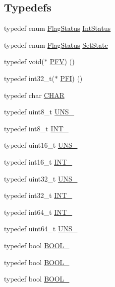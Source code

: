 \subsection*{Typedefs}
\begin{DoxyCompactItemize}
\item 
typedef enum \hyperlink{group___l_p_c___types___public___types_ga89136caac2e14c55151f527ac02daaff}{Flag\+Status} \hyperlink{group___l_p_c___types___public___types_gab7d263072f745b4f3913fb0afc434c4e}{Int\+Status}
\item 
typedef enum \hyperlink{group___l_p_c___types___public___types_ga89136caac2e14c55151f527ac02daaff}{Flag\+Status} \hyperlink{group___l_p_c___types___public___types_ga7fab312a9f10f1386a955977d2ec96fe}{Set\+State}
\item 
typedef void($\ast$ \hyperlink{group___l_p_c___types___public___types_ga5f7b826e88ffb1fae2260abb3a75b19a}{P\+FV}) ()
\item 
typedef int32\+\_\+t($\ast$ \hyperlink{group___l_p_c___types___public___types_ga5cad251913e41ad7a8c765945356ec47}{P\+FI}) ()
\item 
typedef char \hyperlink{group___l_p_c___types___public___types_gaebb9e13210d88d43e32e735ada43a425}{C\+H\+AR}
\item 
typedef uint8\+\_\+t \hyperlink{group___l_p_c___types___public___types_ga7353117656180c64d2216c874998b98b}{U\+N\+S\+\_}
\item 
typedef int8\+\_\+t \hyperlink{group___l_p_c___types___public___types_gac172005ce53b001f50a677cc10bd17b0}{I\+N\+T\+\_}
\item 
typedef uint16\+\_\+t \hyperlink{group___l_p_c___types___public___types_gafce87a7f2271b2cf38d7532f157f8a50}{U\+N\+S\+\_}
\item 
typedef int16\+\_\+t \hyperlink{group___l_p_c___types___public___types_gaae6e34a91bf60db05de64de7720df9a5}{I\+N\+T\+\_}
\item 
typedef uint32\+\_\+t \hyperlink{group___l_p_c___types___public___types_ga28adf5c6b1811ca447826319598d8aba}{U\+N\+S\+\_}
\item 
typedef int32\+\_\+t \hyperlink{group___l_p_c___types___public___types_ga3a17614f3a1b67eaf20781d8ec16a652}{I\+N\+T\+\_}
\item 
typedef int64\+\_\+t \hyperlink{group___l_p_c___types___public___types_ga1a0aab29eee6b306564084e005fa5750}{I\+N\+T\+\_}
\item 
typedef uint64\+\_\+t \hyperlink{group___l_p_c___types___public___types_ga2299199b92f0535ad8c2e2d8c7c7f09b}{U\+N\+S\+\_}
\item 
typedef bool \hyperlink{group___l_p_c___types___public___types_gab02ba567b91b6b3d3c0c0209b2f577a0}{B\+O\+O\+L\+\_}
\item 
typedef bool \hyperlink{group___l_p_c___types___public___types_ga586a49bf86982ab05295515d1e4e35fe}{B\+O\+O\+L\+\_}
\item 
typedef bool \hyperlink{group___l_p_c___types___public___types_ga7cc7a8cc54a0a73fbfcc1eb0b792148d}{B\+O\+O\+L\+\_}
\end{DoxyCompactItemize}
